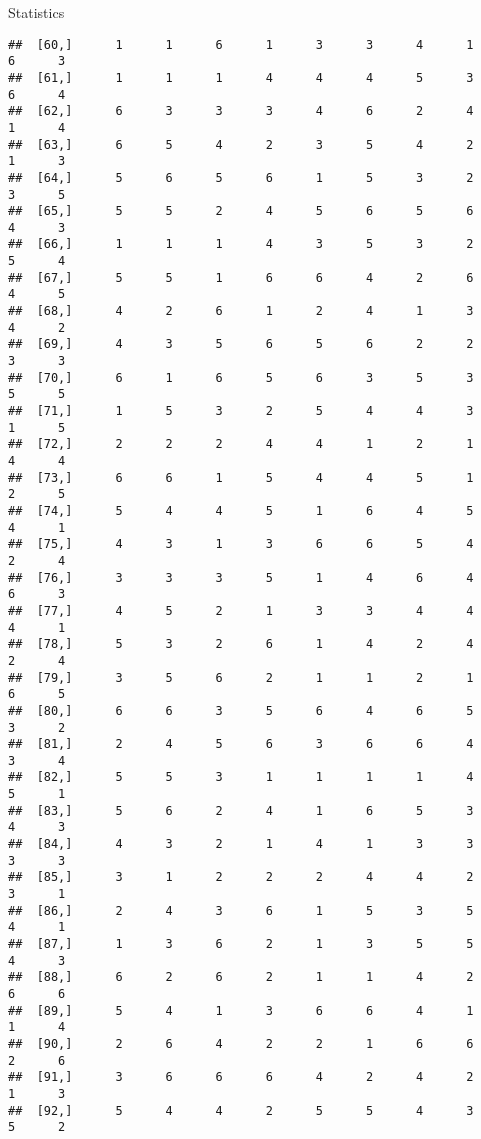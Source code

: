 \documentclass[
  ignorenonframetext,
]{beamer}
\begin{document}
\begin{frame}[fragile]{Statistics}
\begin{verbatim}
##  [60,]      1      1      6      1      3      3      4      1      6      3
##  [61,]      1      1      1      4      4      4      5      3      6      4
##  [62,]      6      3      3      3      4      6      2      4      1      4
##  [63,]      6      5      4      2      3      5      4      2      1      3
##  [64,]      5      6      5      6      1      5      3      2      3      5
##  [65,]      5      5      2      4      5      6      5      6      4      3
##  [66,]      1      1      1      4      3      5      3      2      5      4
##  [67,]      5      5      1      6      6      4      2      6      4      5
##  [68,]      4      2      6      1      2      4      1      3      4      2
##  [69,]      4      3      5      6      5      6      2      2      3      3
##  [70,]      6      1      6      5      6      3      5      3      5      5
##  [71,]      1      5      3      2      5      4      4      3      1      5
##  [72,]      2      2      2      4      4      1      2      1      4      4
##  [73,]      6      6      1      5      4      4      5      1      2      5
##  [74,]      5      4      4      5      1      6      4      5      4      1
##  [75,]      4      3      1      3      6      6      5      4      2      4
##  [76,]      3      3      3      5      1      4      6      4      6      3
##  [77,]      4      5      2      1      3      3      4      4      4      1
##  [78,]      5      3      2      6      1      4      2      4      2      4
##  [79,]      3      5      6      2      1      1      2      1      6      5
##  [80,]      6      6      3      5      6      4      6      5      3      2
##  [81,]      2      4      5      6      3      6      6      4      3      4
##  [82,]      5      5      3      1      1      1      1      4      5      1
##  [83,]      5      6      2      4      1      6      5      3      4      3
##  [84,]      4      3      2      1      4      1      3      3      3      3
##  [85,]      3      1      2      2      2      4      4      2      3      1
##  [86,]      2      4      3      6      1      5      3      5      4      1
##  [87,]      1      3      6      2      1      3      5      5      4      3
##  [88,]      6      2      6      2      1      1      4      2      6      6
##  [89,]      5      4      1      3      6      6      4      1      1      4
##  [90,]      2      6      4      2      2      1      6      6      2      6
##  [91,]      3      6      6      6      4      2      4      2      1      3
##  [92,]      5      4      4      2      5      5      4      3      5      2

\end{verbatim}
\end{frame}
\end{document}
